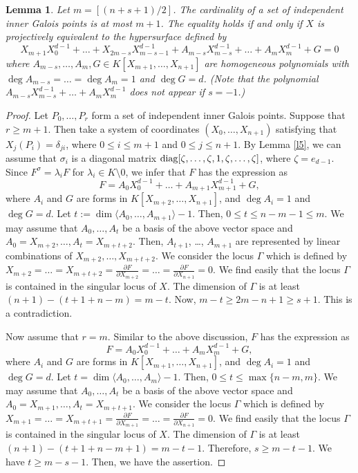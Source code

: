 \documentclass[10pt,oneside]{amsart}
\newtheorem{lemma}{Lemma}
\theoremstyle{definition}
\begin{document}
\begin{lemma}  \label{IndependentInner}
Let $m=[(n+s+1)/2]$. 
The cardinality of a set of independent inner Galois points is at most $m+1$. 
The equality holds if and only if $X$ is projectively equivalent to the hypersurface defined by 
$$X_{m+1}X_0^{d-1}+\dots+X_{2m-s}X_{m-s-1}^{d-1}+A_{m-s}X_{m-s}^{d-1}+\dots+A_mX_m^{d-1}+G=0 $$
where $A_{m-s}, \ldots, A_m , G \in K[X_{m+1}, \ldots, X_{n+1}]$ are homogeneous polynomials with $\deg A_{m-s}=\dots=\deg A_m=1$ and $\deg G=d$.  
(Note that the polynomial $A_{m-s}X_{m-s}^{d-1}+\dots+A_{m}X_m^{d-1}$ does not appear if $s=-1$.)  
\end{lemma}

\begin{proof}
Let $P_0, \ldots, P_r$ form a set of independent inner Galois points. 
Suppose that $r \ge m+1$. 
Then take a system of coordinates $(X_0, \ldots, X_{n+1})$ satisfying that $X_j(P_i)=\delta_{ji}$, where $0 \le i \le m+1$ and $0 \le j \le n+1$. 
By Lemma \ref{l5}, we can assume that $\sigma_i$ is a diagonal matrix ${\rm diag}[\zeta, \ldots, \zeta, 1, \zeta, \ldots, \zeta]$, where $\zeta=e_{d-1}$. 
Since $F^{\sigma}=\lambda_iF$ for $\lambda_i \in K \setminus 0$, we infer that $F$ has the expression as 
$$ F=A_0X_{0}^{d-1}+\dots+A_{m+1}X_{m+1}^{d-1}+G, $$
where $A_i$ and $G$ are forms in $K[X_{m+2}, \ldots, X_{n+1}]$, and $\deg A_i=1$ and $\deg G=d$. 
Let $t:=\dim \langle A_0, \ldots, A_{m+1} \rangle-1$. 
Then, $0 \le t \le n-m-1 \le m$. 
We may assume that $A_0, \ldots, A_{t}$ be a basis of the above vector space and $A_0=X_{m+2}, \ldots, A_{t}=X_{m+t+2}$. 
Then, $A_{t+1}$, \ldots, $A_{m+1}$ are represented by linear combinations of $X_{m+2}, \ldots, X_{m+t+2}$.   
We consider the locus $\Gamma$ which is defined by $X_{m+2}=\dots=X_{m+t+2}=\frac{\partial F}{\partial X_{m+2}}=\dots=\frac{\partial F}{\partial X_{n+1}}=0$. 
We find easily that the locus $\Gamma$ is contained in the singular locus of $X$. 
The dimension of $\Gamma$ is at least $(n+1)-(t+1+n-m)=m-t$. 
Now, $m-t \ge 2m-n+1 \ge s+1$. 
This is a contradiction. 

Now assume that $r=m$. 
Similar to the above discussion, 
$F$ has the expression as 
$$ F=A_0X_{0}^{d-1}+\dots+A_mX_{m}^{d-1}+G, $$
where $A_i$ and $G$ are forms in $K[X_{m+1}, \ldots, X_{n+1}]$, and $\deg A_i=1$ and $\deg G=d$. 
Let $t=\dim \langle A_0, \ldots, A_m \rangle-1$. 
Then, $0 \le t \le \max\{n-m, m\}$. 
We may assume that $A_0, \ldots, A_{t}$ be a basis of the above vector space and $A_0=X_{m+1}, \ldots, A_{t}=X_{m+t+1}$. 
We consider the locus $\Gamma$ which is defined by $X_{m+1}=\dots=X_{m+t+1}=\frac{\partial F}{\partial X_{m+1}}=\dots=\frac{\partial F}{\partial X_{n+1}}=0$. 
We find easily that the locus $\Gamma$ is contained in the singular locus of $X$. 
The dimension of $\Gamma$ is at least $(n+1)-(t+1+n-m+1)=m-t-1$. 
Therefore, $s \ge m-t-1$. 
We have $t \ge m-s-1$. 
Then, we have the assertion. 
\end{proof} 
\end{document}
